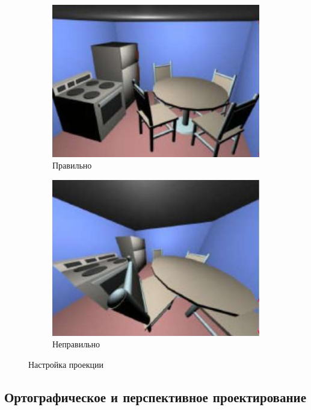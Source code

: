 \documentclass[a4paper, 14pt]{extarticle}
\begin{document}
\begin{figure}[h]
	\centering
	\begin{subfigure}[b]{0.45\textwidth}
		\centering
		\includegraphics[width=\textwidth]{l5/S016.jpg}
		\caption{Правильно}
	\end{subfigure}
	\begin{subfigure}[b]{0.45\textwidth}
		\centering
		\includegraphics[width=\textwidth]{l5/S017.jpg}
		\caption{Неправильно}
	\end{subfigure}
	\caption{Настройка проекции}
\end{figure}

\FloatBarrier
\subsection{Ортографическое и перспективное проектирование}
\end{document}
